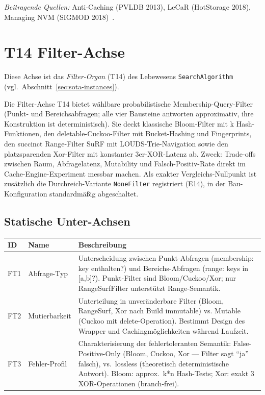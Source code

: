 \emph{Beitragende Quellen:} Anti-Caching (PVLDB 2013), LeCaR (Hot\allowbreak{}Storage 2018), Managing NVM (SIGMOD 2018)~\cite{debrabant2013anticaching,vietri2018lecar,vanrenen2018nvm}.

\section{T14 Filter-Achse}

Diese Achse ist das \emph{Filter-Organ} (T14) des Lebewesens \texttt{SearchAlgorithm} (vgl.\ Abschnitt~\ref{sec:sota-instances}).

Die Filter-Achse T14 bietet wählbare probabilistische Membership-Query-Filter (Punkt- und Bereichsabfragen; alle vier Bausteine antworten approximativ, ihre Konstruktion ist deterministisch). Sie deckt klassische Bloom-Filter mit k Hash-Funktionen, den deletable-Cuckoo-Filter mit Bucket-Hashing und Fingerprints, den succinct Range-Filter Su\allowbreak{}RF mit LOUDS-Trie-Navigation sowie den platzsparenden Xor-Filter mit konstanter 3er-XOR-Latenz ab. Zweck: Trade-offs zwischen Raum, Abfragelatenz, Mutability und Falsch-Positiv-Rate direkt im Cache-Engine-Experiment messbar machen. Als exakter Vergleichs-Nullpunkt ist zusätzlich die Durchreich-Variante \texttt{None\allowbreak{}Filter} registriert (E14), in der Bau-Konfiguration standardmäßig abgeschaltet.

\subsection*{Statische Unter-Achsen}

\begin{scriptsize}
\begin{longtable}{@{}>{\raggedright\arraybackslash}p{1.8cm} >{\raggedright\arraybackslash}p{3.2cm} >{\raggedright\arraybackslash}p{8.5cm}@{}}
\toprule
ID & Name & Beschreibung \\
\midrule
\endhead%
FT1 & Abfrage-Typ & Unterscheidung zwischen Punkt-Abfragen (membership: key enthalten?) und Bereichs-Abfragen (range: keys in [a,b]?). Punkt-Filter sind Bloom/\allowbreak{}Cuckoo/\allowbreak{}Xor; nur Range\allowbreak{}Surf\allowbreak{}Filter unterstützt Range-Semantik. \\
FT2 & Mutierbarkeit & Unterteilung in unveränderbare Filter (Bloom, Range\allowbreak{}Surf, Xor nach Build immutable) vs. Mutable (Cuckoo mit delete-Operation). Bestimmt Design des Wrapper und Cachingmöglichkeiten während Laufzeit. \\
FT3 & Fehler-Profil & Charakterisierung der fehlertoleranten Semantik: False-Positive-Only (Bloom, Cuckoo, Xor --- Filter sagt \enquote{ja} falsch), vs.\ lossless (theoretisch deterministische Antwort). Bloom: approx.\ k*n Hash-Tests; Xor: exakt 3 XOR-Operationen (branch-frei). \\
\bottomrule
\end{longtable}
\end{scriptsize}

